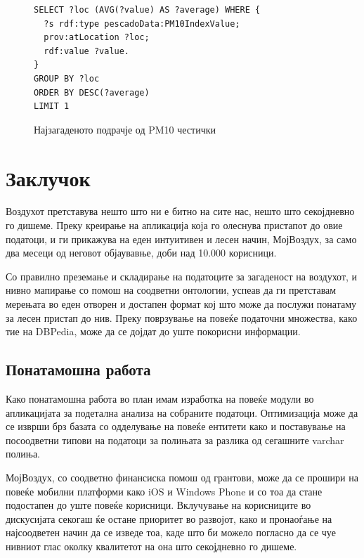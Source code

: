 \documentclass{uvamscse}
\begin{document}
\begin{figure}[H]
\centering
\begin{snippet}
\begin{verbatim}
SELECT ?loc (AVG(?value) AS ?average) WHERE {
  ?s rdf:type pescadoData:PM10IndexValue;
  prov:atLocation ?loc;
  rdf:value ?value.
}
GROUP BY ?loc
ORDER BY DESC(?average)
LIMIT 1
\end{verbatim}
\end{snippet}
\caption{Најзагаденото подрачје од PM10 честички}
\end{figure}



\chapter{Заклучок}

Воздухот претставува нешто што ни е битно на сите нас, нешто што секојдневно го дишеме. Преку креирање на апликација која го олеснува пристапот до овие податоци, и ги прикажува на еден интуитивен и лесен начин, МојВоздух, за само два месеци од неговот објаувавње, доби над 10.000 корисници.
\vspace{5mm}

Со правилно преземање и складирање на податоците за загаденост на воздухот, и нивно мапирање со помош на соодветни онтологии, успеав да ги претставам мерењата во еден отворен и достапен формат кој што може да послужи понатаму за лесен пристап до нив. Преку поврзување на повеќе податочни множества, како тие на DBPedia, може да се дојдат до уште покорисни информации.

\section{Понатамошна работа}

Како понатамошна работа во план имам изработка на повеќе модули во апликацијата за подетална анализа на собраните податоци. Оптимизација може да се изврши брз базата со одделување на повеќе ентитети како и поставување на посоодветни типови на податоци за полињата за разлика од сегашните varchar полиња.
\vspace{5mm}

МојВоздух, со соодветно финансиска помош од грантови, може да се прошири на повеќе мобилни платформи како iOS и Windows Phone и со тоа да стане подостапен до уште повеќе корисници. Вклучување на корисниците во дискусијата секогаш ќе остане приоритет во развојот, како и пронаоѓање на најсоодветен начин да се изведе тоа, каде што би можело погласно да се чуе нивниот глас околку квалитетот на она што секојдневно го дишеме.
\end{document}
